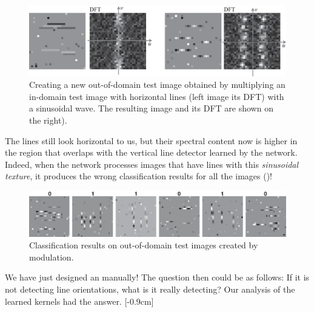 \begin{figure}
    \includegraphics[width=1\linewidth]{./figures/convolutional_neural_nets/oriented_bars_cnn_test_adversarial_creation1.eps}
    \caption{Creating a new out-of-domain test image obtained by multiplying an in-domain test image with horizontal lines (left image its DFT) with a sinusoidal wave. The resulting image and its DFT are shown on the right).}
    \label{fig:convolutional_neural_nets:oriented_bars_cnn_test_adversarial_creation1}
\end{figure}

The lines still look horizontal to us, but their spectral content now is higher in the region that overlaps with the vertical line detector learned by the network. Indeed, when the network processes images that have lines with this {\em sinusoidal texture}, it produces the wrong classification results for all the images (\fig{\ref{fig:convolutional_neural_nets:oriented_bars_cnn_test_adversarial}})!

\begin{figure}
    \includegraphics[width=1\linewidth]{./figures/convolutional_neural_nets/oriented_bars_cnn_test_adversarial.eps}
    \caption{Classification results on out-of-domain test images created by modulation.}
    \label{fig:convolutional_neural_nets:oriented_bars_cnn_test_adversarial}
\end{figure}

We have just designed an  manually! The question then could be as follows: If it is not detecting line orientations, what is it really detecting? Our analysis of the learned kernels had the answer. [-0.9cm]

